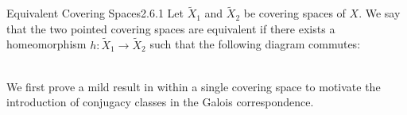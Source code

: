 \documentclass[a4paper]{article}
\begin{document}
\begin{defn}{Equivalent Covering Spaces}{2.6.1} Let $\tilde{X}_1$ and $\tilde{X}_2$ be covering spaces of $X$. We say that the two pointed covering spaces are equivalent if there exists a homeomorphism $h:\tilde{X}_1\to\tilde{X}_2$ such that the following diagram commutes: \\~\\
\end{defn}

We first prove a mild result in within a single covering space to motivate the introduction of conjugacy classes in the Galois correspondence. 
\end{document}
